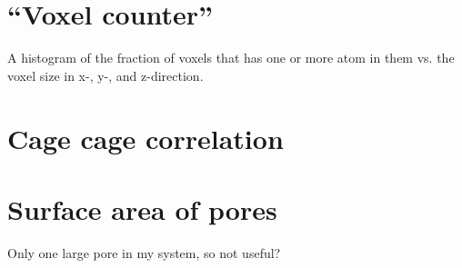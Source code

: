 \section{``Voxel counter''}
    A histogram of the fraction of voxels that has one or more atom in them vs. the voxel size in x-, y-, and z-direction.
    
\section{Cage cage correlation}

\section{Surface area of pores}
    Only one large pore in my system, so not useful?
